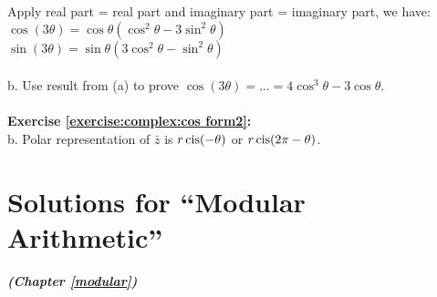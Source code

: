 Apply real part = real part and imaginary part = imaginary part, we have:\\
$\cos(3\theta)=\cos\theta(\cos^{2}\theta-3\sin^{2}\theta)$\\
$\sin(3\theta)=\sin\theta(3\cos^{2}\theta-\sin^{2}\theta)$\\
\\
b. Use result from (a) to prove $\cos(3\theta)=...=4\cos^{3}\theta-3\cos\theta $.\\
\\
\textbf{Exercise \ref{exercise:complex:cos form2}:}\\
b. Polar representation of $\bar{z}$ is $r\operatorname{cis}(-\theta)$ or $r\operatorname{cis}(2\pi-\theta)$.\\

\section{Solutions for ``Modular Arithmetic''}
\noindent \textbf{\textit{ (Chapter \ref{modular})}}\bigskip

